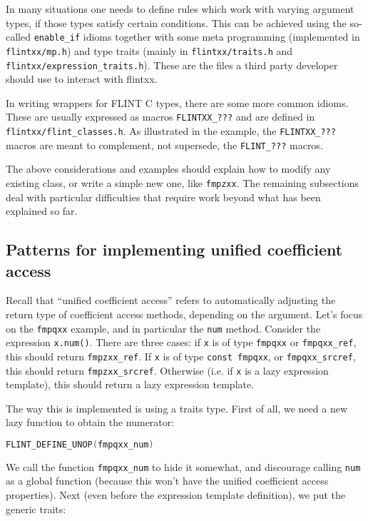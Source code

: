\documentclass[a4paper,10pt]{book}
\newcommand{\code}{\lstinline}
\begin{document}
{{In many situations one needs to define rules which work with varying argument
types, if those types satisfy certain conditions. This can be achieved using the
so-called \code{enable_if} idioms together with some meta programming
(implemented in \code{flintxx/mp.h}) and type traits (mainly in
\code{flintxx/traits.h} and \code{flintxx/expression_traits.h}). These are the
files a third party developer should use to interact with flintxx.

In writing wrappers for FLINT C types, there are some more common idioms. These
are usually expressed as macros \code{FLINTXX_???} and are defined in
\code{flintxx/flint_classes.h}. As illustrated in the example, the
\code{FLINTXX_???} macros are meant to complement, not supersede, the
\code{FLINT_???} macros.

The above considerations and examples should explain how to modify any existing
class, or write a simple new one, like \code{fmpzxx}. The remaining subsections
deal with particular difficulties that require work beyond what has been
explained so far.

\subsection{Patterns for implementing unified coefficient access}

Recall that ``unified coefficient access'' refers to automatically adjusting the
return type of coefficient access methods, depending on the argument. Let's
focus on the \code{fmpqxx} example, and in particular the \code{num} method.
Consider the expression \code{x.num()}. There are three cases: if \code{x} is of
type \code{fmpqxx} or \code{fmpqxx_ref}, this should return \code{fmpzxx_ref}.
If \code{x} is of type \code{const fmpqxx}, or \code{fmpqxx_srcref}, this should
return \code{fmpzxx_srcref}. Otherwise (i.e. if \code{x} is a lazy expression
template), this should return a lazy expression template.

The way this is implemented is using a traits type. First of all, we need a new
lazy function to obtain the numerator:

\begin{lstlisting}[language=c++]
FLINT_DEFINE_UNOP(fmpqxx_num)
\end{lstlisting}

We call the function \code{fmpqxx_num} to hide it somewhat, and discourage
calling \code{num} as a global function (because this won't have the unified
coefficient access properties). Next (even before the expression template
definition), we put the generic traits:

}}
\end{document}

